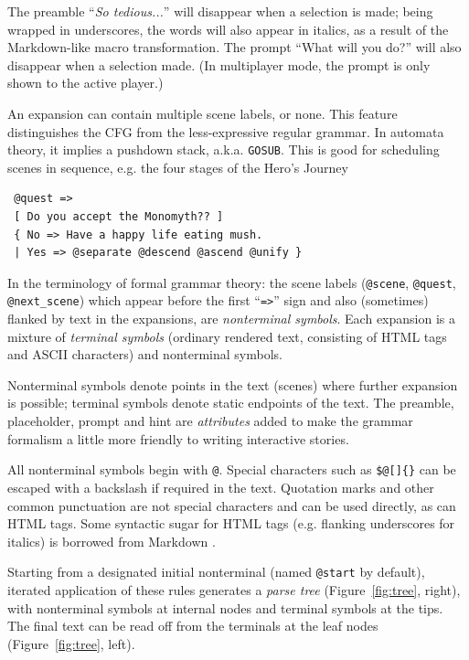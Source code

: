 \documentclass{acm_proc_article-sp}
\begin{document}
The preamble ``{\em So tedious...}'' will disappear when a selection is made; being wrapped in underscores, the words will also appear in italics, as a result of the Markdown-like macro transformation.
The prompt ``What will you do?'' will also disappear when a selection made.
(In multiplayer mode, the prompt is only shown to the active player.)

An expansion can contain multiple scene labels, or none. This feature distinguishes the CFG from the less-expressive regular grammar.
In automata theory, it implies a pushdown stack, a.k.a. {\tt GOSUB}.
This is good for scheduling scenes in sequence, e.g. the four stages of the Hero's Journey
\begin{verbatim}
 @quest =>
 [ Do you accept the Monomyth?? ]
 { No => Have a happy life eating mush.
 | Yes => @separate @descend @ascend @unify }
\end{verbatim}


In the terminology of formal grammar theory: the scene labels ({\tt @scene}, {\tt @quest}, {\tt @next\_scene}) which appear before the first ``{\tt =>}'' sign and also (sometimes) flanked by text in the expansions, are {\em nonterminal symbols}.
Each expansion is a mixture of {\em terminal symbols} (ordinary rendered text, consisting of HTML tags and ASCII characters) and nonterminal symbols.

Nonterminal symbols denote points in the text (scenes) where further expansion is possible;
terminal symbols denote static endpoints of the text.
The preamble, placeholder, prompt and hint are {\em attributes}
added to make the grammar formalism a little more friendly to writing interactive stories.

All nonterminal symbols begin with {\tt @}.
Special characters such as {\tt \$@[]\{\}} can be escaped with a backslash if required in the text.
Quotation marks and other common punctuation are not special characters and can be used directly, as can HTML tags.
Some syntactic sugar for HTML tags (e.g. flanking underscores for italics) is borrowed from Markdown \cite{Markdown}.

Starting from a designated initial nonterminal (named {\tt @start} by default),
iterated application of these rules generates a {\em parse tree} (Figure~\ref{fig:tree}, right),
with nonterminal symbols at internal nodes and terminal symbols at the tips.
The final text can be read off from the terminals at the leaf nodes (Figure~\ref{fig:tree}, left).
\end{document}
